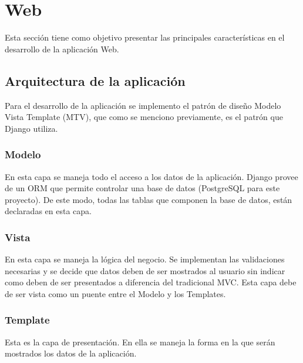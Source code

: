 \section{Web}

Esta sección tiene como objetivo presentar las principales características en el desarrollo de la aplicación Web.

\subsection{Arquitectura de la aplicación}
Para el desarrollo de la aplicación se implemento el patrón de diseño Modelo Vista Template (MTV), que como se menciono previamente, es el patrón que Django utiliza.

\subsubsection{Modelo}
En esta capa se maneja todo el acceso a los datos de la aplicación. Django provee de un ORM que permite controlar una base de datos (PostgreSQL para este proyecto). De este modo, todas las tablas que componen la base de datos, están declaradas en esta capa.

\subsubsection{Vista}
En esta capa se maneja la lógica del negocio. Se implementan las validaciones necesarias y se decide que datos deben de ser mostrados al usuario sin indicar como deben de ser presentados a diferencia del tradicional MVC. Esta capa debe de ser vista como un puente entre el Modelo y los Templates.

\subsubsection{Template}
Esta es la capa de presentación. En ella se maneja la forma en la que serán mostrados los datos de la aplicación.